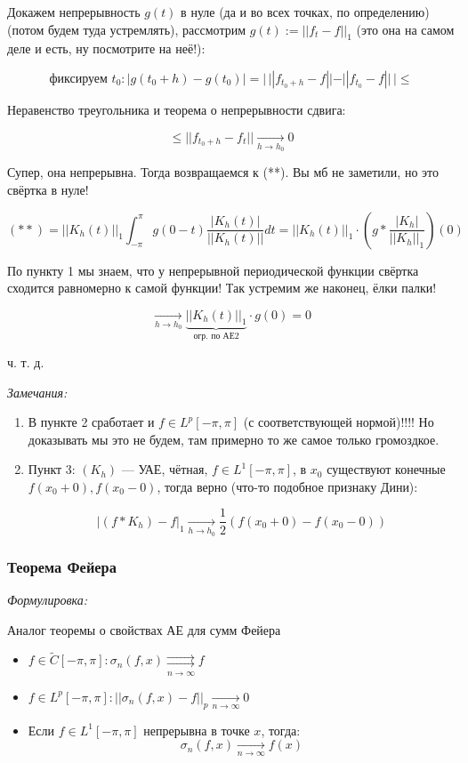 \documentclass{article}
\def\rsh#1{\underset{#1}{\rightrightarrows}}
\def\goesto#1{\underset{#1}{\longrightarrow}}
\def\toinf#1{\goesto{#1 \rightarrow \infty}}
\def\ntoinf{\toinf{n}}
\begin{document}
Докажем непрерывность $g(t)$ в нуле (да и во всех точках, по определению) (потом будем туда устремлять), рассмотрим $g(t) := ||f_t - f||_1$ (это она на самом деле и есть, ну посмотрите на неё!):

\[\text{фиксируем } t_0: |g(t_0 + h) - g(t_0)| = | \,||f_{t_0 + h} - f|| - ||f_{t_0} - f|| \,| \le \]

Неравенство треугольника и теорема о непрерывности сдвига:

\[\le ||f_{t_0 + h} - f_t|| \goesto{h \rightarrow h_0} 0\]

Супер, она непрерывна. Тогда возвращаемся к (**). Вы мб не заметили, но это свёртка в нуле!

\[ (**) = ||K_h(t)||_1\int_{-\pi}^{\pi} g(0 - t) \frac{|K_h(t)|}{||K_h(t)||}dt = ||K_h(t)||_1 \cdot \left(g * \frac{|K_h|}{||K_h||_1}\right)(0)\]

По пункту 1 мы знаем, что у непрерывной периодической функции свёртка сходится равномерно к самой функции! Так устремим же наконец, ёлки палки!

\[\goesto{h \rightarrow h_0} \underbrace{||K_h(t)||_1}_{\text{огр. по АЕ2}} \cdot g(0) = 0\]

ч. т. д.

\textit{Замечания:} 

\begin{enumerate}
    \item В пункте 2 сработает и $f \in L^p[-\pi, \pi]$ (с соответствующей нормой)!!!! Но доказывать мы это не будем, там примерно то же самое только громоздкое.
    \item Пункт 3: $(K_h)$ --- УАЕ, чётная, $f \in L^1[-\pi, \pi]$, в $x_0$ существуют конечные $f(x_0 + 0), f(x_0  - 0)$, тогда верно (что-то подобное признаку Дини):
    
    \[|(f * K_h) - f|_1 \goesto{h \rightarrow h_0} \frac{1}{2}(f(x_0 + 0) - f(x_0 - 0))\]
\end{enumerate}

\subsubsection{Теорема Фейера}
\textit{Формулировка:}

Аналог теоремы о свойствах АЕ для сумм Фейера

\begin{itemize}
    \item $f \in \tilde{C}[-\pi, \pi]: \sigma_n(f, x) \rsh{n \rightarrow \infty} f$
    \item $f \in L^p[-\pi, \pi]: ||\sigma_n(f, x) - f||_p \ntoinf 0$
    \item Если $f \in L^1[-\pi, \pi]$ непрерывна в точке $x$, тогда:
    \[\sigma_n(f, x) \ntoinf f(x)\]
\end{itemize}
\end{document}
